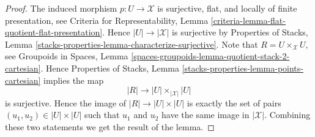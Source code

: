 \documentclass[10pt,a4paper]{amsart}
\theoremstyle{plain}
\theoremstyle{definition}
\theoremstyle{remark}
\numberwithin{equation}{subsection}
\begin{document}
\begin{proof}
The induced morphism $p : U \to \mathcal{X}$ is surjective, flat,
and locally of finite presentation, see
Criteria for Representability, Lemma
\ref{criteria-lemma-flat-quotient-flat-presentation}.
Hence $|U| \to |\mathcal{X}|$ is surjective by
Properties of Stacks, Lemma
\ref{stacks-properties-lemma-characterize-surjective}.
Note that $R = U \times_\mathcal{X} U$, see
Groupoids in Spaces,
Lemma \ref{spaces-groupoids-lemma-quotient-stack-2-cartesian}.
Hence
Properties of Stacks, Lemma \ref{stacks-properties-lemma-points-cartesian}
implies the map
$$
|R| \longrightarrow |U| \times_{|\mathcal{X}|} |U|
$$
is surjective. Hence the image of $|R| \to |U| \times |U|$ is
exactly the set of pairs $(u_1, u_2) \in |U| \times |U|$
such that $u_1$ and $u_2$ have the same image in $|\mathcal{X}|$.
Combining these two statements we get the result of the lemma.
\end{proof}
\end{document}
